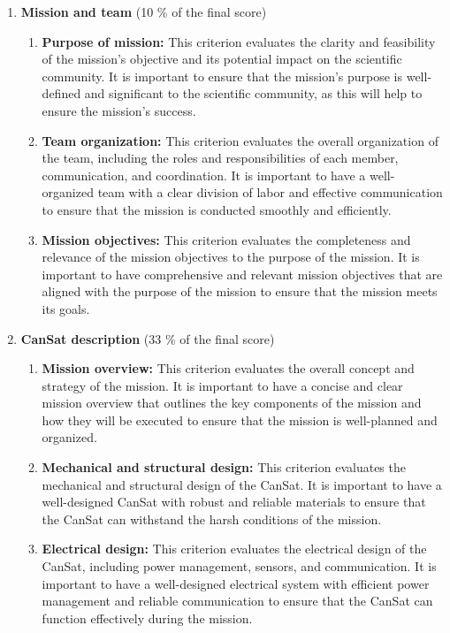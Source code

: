 \documentclass[11pt]{article}
\begin{document}
\begin{enumerate}
    \item {\textbf{Mission and team} (10 \% of the final score)}
    \begin{enumerate}
        \item {\textbf{Purpose of mission:}} This criterion evaluates the clarity and feasibility of the mission's objective and its potential impact on the scientific community. It is important to ensure that the mission's purpose is well-defined and significant to the scientific community, as this will help to ensure the mission's success.

        \item {\textbf{Team organization:}} This criterion evaluates the overall organization of the team, including the roles and responsibilities of each member, communication, and coordination. It is important to have a well-organized team with a clear division of labor and effective communication to ensure that the mission is conducted smoothly and efficiently.

        \item {\textbf{Mission objectives:}} This criterion evaluates the completeness and relevance of the mission objectives to the purpose of the mission. It is important to have comprehensive and relevant mission objectives that are aligned with the purpose of the mission to ensure that the mission meets its goals.
    \end{enumerate}
    
    \item {\textbf{CanSat description} (33 \% of the final score)}
    \begin{enumerate}
        \item {\textbf{Mission overview:}} This criterion evaluates the overall concept and strategy of the mission. It is important to have a concise and clear mission overview that outlines the key components of the mission and how they will be executed to ensure that the mission is well-planned and organized.

        \item {\textbf{Mechanical and structural design:}} This criterion evaluates the mechanical and structural design of the CanSat. It is important to have a well-designed CanSat with robust and reliable materials to ensure that the CanSat can withstand the harsh conditions of the mission.

        \item {\textbf{Electrical design:}} This criterion evaluates the electrical design of the CanSat, including power management, sensors, and communication. It is important to have a well-designed electrical system with efficient power management and reliable communication to ensure that the CanSat can function effectively during the mission.


\end{enumerate}
\end{enumerate}
\end{document}
